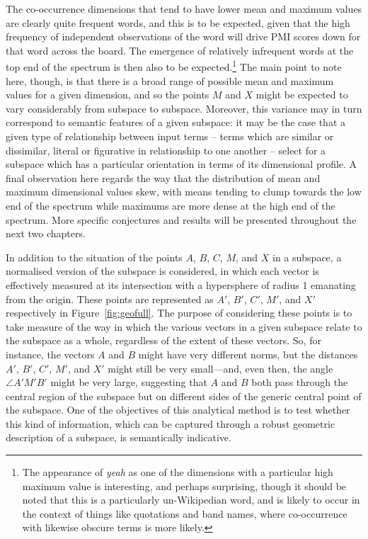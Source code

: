 The co-occurrence dimensions that tend to have lower mean and maximum values are clearly quite frequent words, and this is to be expected, given that the high frequency of independent observations of the word will drive PMI scores down for that word across the board.  The emergence of relatively infrequent words at the top end of the spectrum is then also to be expected.\footnote{The appearance of \emph{yeah} as one of the dimensions with a particular high maximum value is interesting, and perhaps surprising, though it should be noted that this is a particularly un-Wikipedian word, and is likely to occur in the context of things like quotations and band names, where co-occurrence with likewise obscure terms is more likely.}  The main point to note here, though, is that there is a broad range of possible mean and maximum values for a given dimension, and so the points $M$ and $X$ might be expected to vary considerably from subspace to subspace.  Moreover, this variance may in turn correspond to semantic features of a given subspace: it may be the case that a given type of relationship between input terms -- terms which are similar or dissimilar, literal or figurative in relationship to one another -- select for a subspace which has a particular orientation in terms of its dimensional profile.  A final observation here regards the way that the distribution of mean and maximum dimensional values skew, with means tending to clump towards the low end of the spectrum while maximums are more dense at the high end of the spectrum.  More specific conjectures and results will be presented throughout the next two chapters.

In addition to the situation of the points $A$, $B$, $C$, $M$, and $X$ in a subspace, a normalised version of the subspace is considered, in which each vector is effectively measured at its intersection with a hypersphere of radius 1 emanating from the origin.  These points are represented as $A'$, $B'$, $C'$, $M'$, and $X'$ respectively in Figure~\ref{fig:geofull}.  The purpose of considering these points is to take measure of the way in which the various vectors in a given subspace relate to the subspace as a whole, regardless of the extent of these vectors.  So, for instance, the vectors $A$ and $B$ might have very different norms, but the distances $A'$, $B'$, $C'$, $M'$, and $X'$ might still be very small---and, even then, the angle $\angle A'M'B'$ might be very large, suggesting that $A$ and $B$ both pass through the central region of the subspace but on different sides of the generic central point of the subspace.  One of the objectives of this analytical method is to test whether this kind of information, which can be captured through a robust geometric description of a subspace, is semantically indicative.

